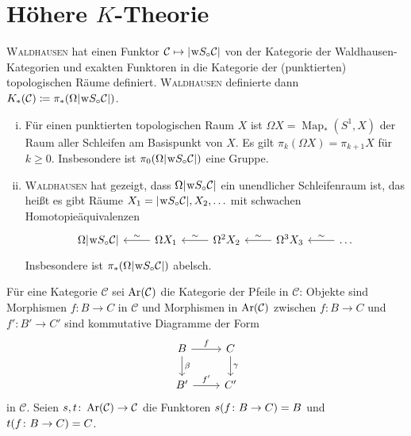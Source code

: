 \newpage

\section{Höhere $K$-Theorie} %
\label{sec:6}

\textsc{Waldhausen} hat einen Funktor $\mathcal{C} \mapsto \abs*{\w S_\circ  \mathcal{C}}$ von der Kategorie der Waldhausen-Kategorien und exakten Funktoren in die Kategorie der (punktierten) topologischen Räume definiert.
\textsc{Waldhausen} definierte dann $K_*(\mathcal{C}) \coloneqq \pi_* \enbrace*{\Omega \abs*{\w S_\circ \mathcal{C}}}$.

\begin{bemerkung}
	\begin{enumerate}[(i)]
		\item Für einen punktierten topologischen Raum $X$ ist $\Omega X = \operatorname{Map}_*(S^1,X)$ der Raum aller Schleifen am Basispunkt von $X$.
		Es gilt $\pi_k(\Omega X) = \pi_{k+1} X$ für $k \ge 0$.
		Insbesondere ist $\pi_0 \enbrace*{\Omega \abs*{\w S_\circ \mathcal{C}} }$ eine Gruppe.
		\item \textsc{Waldhausen} hat gezeigt, dass $\Omega \abs*{\w S_\circ \mathcal{C}} $ ein unendlicher Schleifenraum ist, das heißt es gibt Räume $X_1 = \abs*{\w S_\circ  \mathcal{C}}, X_2, \ldots  $ mit schwachen Homotopieäquivalenzen
		\[
			\begin{tikzcd}
				\Omega \abs*{\w S_\circ  \mathcal{C}} & \Omega X_1 \lar["\sim"'] & \Omega^2 X_2 \lar["\sim"'] & \Omega^3 X_3 \lar["\sim"'] & \ldots \lar["\sim"']
			\end{tikzcd}
		\]
		Insbesondere ist $\pi_* \enbrace*{\Omega \abs*{\w S_\circ  \mathcal{C}}}$ abelsch.
	\end{enumerate}
\end{bemerkung}

\begin{definition}
	Für eine Kategorie $\mathcal{C}$ sei $\Ar(\mathcal{C})$ die Kategorie der Pfeile in $\mathcal{C}$: Objekte sind Morphismen $f \colon B \to C$ in $\mathcal{C}$ und Morphismen in $\Ar(\mathcal{C})$ zwischen $f \colon B \to C$ und $f' \colon B' \to C'$ sind kommutative Diagramme der Form
	\[
		\begin{tikzcd}
			B \rar["f"] \dar["\beta"] & C \dar["\gamma"] \\
			B' \rar["f'"] & C'
		\end{tikzcd}
	\]
	in $\mathcal{C}$.
	Seien $s,t \colon \Ar(\mathcal{C}) \to \mathcal{C}$ die Funktoren $s \enbrace*{f \colon B \to C} = B$ und $t \enbrace*{f \colon B \to C} =C$.
\end{definition}

